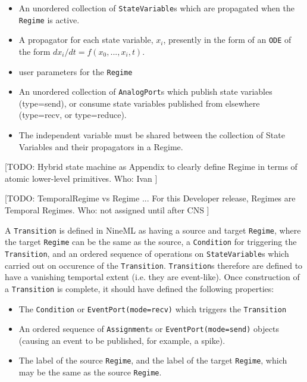 \documentclass[a4paper]{article}
\newcommand\nmlClass[1]{{\tt #1}}
\begin{document}
\begin{itemize}
\item An unordered collection of \nmlClass{StateVariable}s which are propagated when the \nmlClass{Regime} is active.
\item A propagator for each state variable, $x_i$, presently in the
  form of an \nmlClass{ODE} of the form $dx_i/dt = f(x_0, ..., x_i, t)$.
\item user parameters for the \nmlClass{Regime}
\item An unordered collection of \nmlClass{AnalogPort}s which publish state variables (type=send),
  or consume state variables published from elsewhere (type=recv, or type=reduce).
\item The independent variable must be shared between the collection 
of State Variables and their propagators in a Regime.
\end{itemize}

[TODO: Hybrid state machine as Appendix to clearly define Regime
in terms of atomic lower-level primitives.
Who: Ivan
]

[TODO:
TemporalRegime vs Regime ...
For this Developer release, Regimes are Temporal Regimes.
Who: not assigned until after CNS
]

A \nmlClass{Transition} is defined in NineML as having a source and target
\nmlClass{Regime}, where the target \nmlClass{Regime} can be the same as the source, a
\nmlClass{Condition} for triggering the \nmlClass{Transition}, and an ordered sequence of
operations on \nmlClass{StateVariable}s which carried out on occurence of the
\nmlClass{Transition}.  \nmlClass{Transition}s therefore are defined to have a vanishing
temportal extent (i.e. they are event-like).  Once construction of a
\nmlClass{Transition} is complete, it should have defined the following properties:
\begin{itemize}
\item The \nmlClass{Condition} or \nmlClass{EventPort(mode=recv)} which triggers the \nmlClass{Transition}
\item An ordered sequence of \nmlClass{Assignment}s or
  \nmlClass{EventPort(mode=send)} objects (causing an event to be published, for example, a spike).
\item The label of the source \nmlClass{Regime}, and the label of the target
  \nmlClass{Regime}, which may be the same as the source \nmlClass{Regime}.
\end{itemize}
\end{document}
